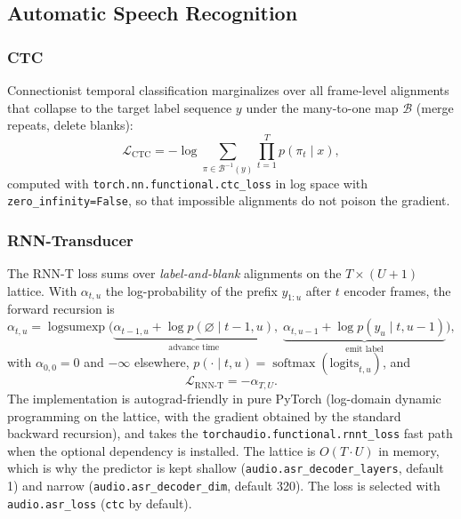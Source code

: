 \subsection{Automatic Speech Recognition}

\subsubsection{CTC}

Connectionist temporal classification \citep{Graves2006ctc} marginalizes over all frame-level alignments that collapse to the target label sequence $y$ under the many-to-one map $\mathcal{B}$ (merge repeats, delete blanks):
\begin{equation}
\mathcal{L}_{\text{CTC}} = -\log \sum_{\pi \in \mathcal{B}^{-1}(y)} \prod_{t=1}^{T} p(\pi_t \mid x),
\label{eq:audio-ctc}
\end{equation}
computed with \texttt{torch.nn.functional.ctc\_loss} in log space with \texttt{zero\_infinity=False}, so that impossible alignments do not poison the gradient.

\subsubsection{RNN-Transducer}

The RNN-T loss \citep{Graves2012} sums over \emph{label-and-blank} alignments on the $T \times (U+1)$ lattice. With $\alpha_{t,u}$ the log-probability of the prefix $y_{1:u}$ after $t$ encoder frames, the forward recursion is
\begin{equation}
\alpha_{t,u} = \operatorname{logsumexp}\Big(
\underbrace{\alpha_{t-1,u} + \log p(\varnothing \mid t-1, u)}_{\text{advance time}},
\;
\underbrace{\alpha_{t,u-1} + \log p(y_u \mid t, u-1)}_{\text{emit label}}
\Big),
\label{eq:audio-rnnt}
\end{equation}
with $\alpha_{0,0} = 0$ and $-\infty$ elsewhere, $p(\cdot \mid t,u) = \operatorname{softmax}(\mathrm{logits}_{t,u})$, and
\begin{equation}
\mathcal{L}_{\text{RNN-T}} = -\alpha_{T,U}.
\label{eq:audio-rnnt-loss}
\end{equation} The implementation is autograd-friendly in pure PyTorch (log-domain dynamic programming on the lattice, with the gradient obtained by the standard backward recursion), and takes the \texttt{torchaudio.functional.rnnt\_loss} fast path when the optional dependency is installed. The lattice is $O(T \cdot U)$ in memory, which is why the predictor is kept shallow (\texttt{audio.asr\_decoder\_layers}, default 1) and narrow (\texttt{audio.asr\_decoder\_dim}, default 320). The loss is selected with \texttt{audio.asr\_loss} (\texttt{ctc} by default).

